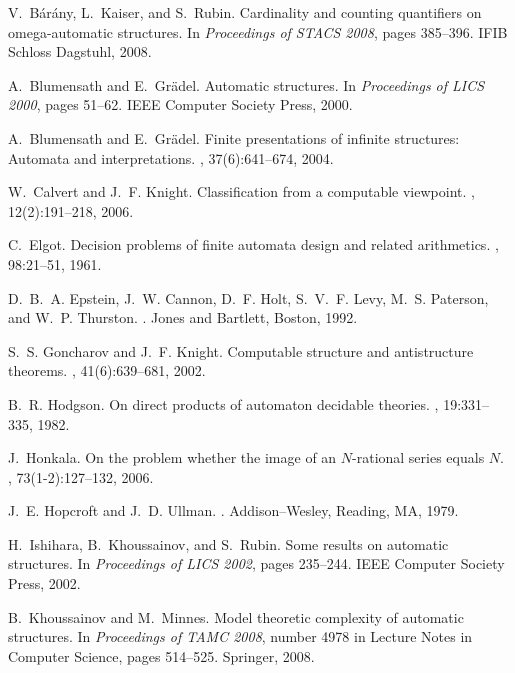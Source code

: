 \documentclass[envcountsame]{llncs}
\begin{document}
\def\cprime{$'$}
\begin{thebibliography}{10}

V.~B{\'a}r{\'a}ny, L.~Kaiser, and S.~Rubin.
\newblock Cardinality and counting quantifiers on omega-automatic structures.
\newblock In {\em Proceedings of  STACS 2008}, pages 385--396. IFIB Schloss Dagstuhl, 2008.

A.~Blumensath and E.~Gr{\"a}del.
\newblock Automatic structures.
\newblock In {\em Proceedings of LICS 2000}, pages 51--62. {IEEE} {C}omputer
  {S}ociety {P}ress, 2000.

A.~Blumensath and E.~Gr{\"a}del.
\newblock Finite presentations of infinite structures: Automata and
  interpretations.
, 37(6):641--674, 2004.

W.~Calvert and J.~F. Knight.
\newblock Classification from a computable viewpoint.
, 12(2):191--218, 2006.

C.~Elgot.
\newblock Decision problems of finite automata design and related arithmetics.
, 98:21--51, 1961.

D.~B.~A. Epstein, J.~W. Cannon, D.~F. Holt, S.~V.~F. Levy, M.~S. Paterson, and
  W.~P. Thurston.
.
\newblock Jones and Bartlett, Boston, 1992.

S.~S. Goncharov and J.~F. Knight.
\newblock Computable structure and antistructure theorems.
, 41(6):639--681, 2002.

B.~R. Hodgson.
\newblock On direct products of automaton decidable theories.
, 19:331--335, 1982.

J.~Honkala.
\newblock On the problem whether the image of an {$N$}-rational series equals
  {$N$}.
, 73(1-2):127--132, 2006.

J.~E. Hopcroft and J.~D. Ullman.
.
\newblock Addison--Wesley, Reading, MA, 1979.

H.~Ishihara, B.~Khoussainov, and S.~Rubin.
\newblock Some results on automatic structures.
\newblock In {\em Proceedings of LICS 2002}, pages 235--244. {IEEE}
  {C}omputer {S}ociety {P}ress, 2002.

B.~Khoussainov and M.~Minnes.
\newblock Model theoretic complexity of automatic structures.
\newblock In {\em Proceedings of TAMC 2008}, number 4978 in Lecture Notes in
  Computer Science, pages 514--525. Springer, 2008.


\end{thebibliography}
\end{document}
